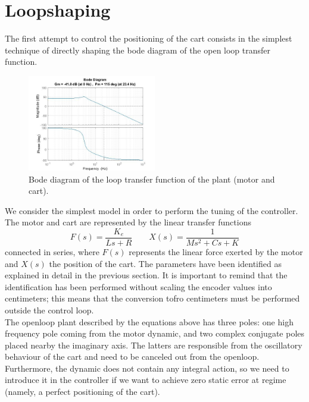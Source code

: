 \section{Loopshaping}
The first attempt to control the positioning of the cart consists in the simplest technique of directly shaping the bode diagram of the open loop transfer function. 

\begin{figure}[h]
\centering
\includegraphics[width=0.5\textwidth]{img/ls_bode_ol.jpg}
\caption{Bode diagram of the loop transfer function of the plant (motor and cart).}
\end{figure}

We consider the simplest model in order to perform the tuning of the controller. The motor and cart are represented by the linear transfer functions 
\begin{equation}
F(s) = \frac{K_e}{Ls+R} \qquad X(s) = \frac{1}{Ms^2+Cs+K}
\end{equation}
connected in series, where $F(s)$ represents the linear force exerted by the motor and $X(s)$ the position of the cart. The parameters have been identified as explained in detail in the previous section. It is important to remind that the identification has been performed without scaling the encoder values into centimeters; this means that the conversion tofro centimeters must be performed outside the control loop.\\

The openloop plant described by the equations above has three poles: one high frequency pole coming from the motor dynamic, and two complex conjugate poles placed nearby the imaginary axis. The latters are responsible from the oscillatory behaviour of the cart and need to be canceled out from the openloop. Furthermore, the dynamic does not contain any integral action, so we need to introduce it in the controller if we want to achieve zero static error at regime (namely, a perfect positioning of the cart).\\

